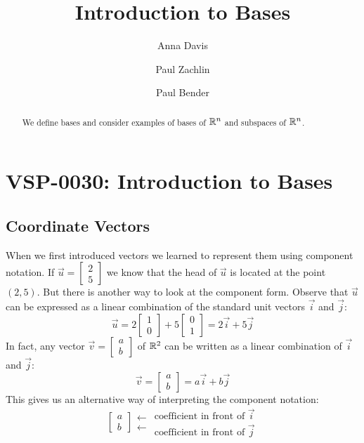 \documentclass{ximera}
\author{Anna Davis \and Paul Zachlin \and Paul Bender} \title{Introduction to Bases} \license{CC-BY 4.0}
\begin{document}
\begin{abstract}
We define bases and consider examples of bases of $\mathbb{R}^n$ and subspaces of $\mathbb{R}^n$.
\end{abstract}
\maketitle

\section*{VSP-0030:  Introduction to Bases}
\subsection*{Coordinate Vectors}
When we first introduced vectors we learned to represent them using component notation.  If $\vec{u}=\begin{bmatrix}2\\5\end{bmatrix}$ we know that the head of $\vec{u}$ is located at the point $(2, 5)$.  But there is another way to look at the component form.  Observe that $\vec{u}$ can be expressed as a linear combination of the standard unit vectors $\vec{i}$ and $\vec{j}$:
$$\vec{u}=2\begin{bmatrix}1\\0\end{bmatrix}+5\begin{bmatrix}0\\1\end{bmatrix}=2\vec{i}+5\vec{j}$$
In fact, any vector $\vec{v}=\begin{bmatrix}a\\b\end{bmatrix}$ of $\mathbb{R}^2$ can be written as a linear combination of $\vec{i}$ and $\vec{j}$:
$$\vec{v}=\begin{bmatrix}a\\b\end{bmatrix}=a\vec{i}+b\vec{j}$$
This gives us an alternative way of interpreting the component notation:
$$\left[\begin{array}{c}  
 a\\b
 \end{array}\right]
 \begin{array}{c}
 \longleftarrow\\
 \longleftarrow
 \end{array}
\begin{array}{c}  
 \mbox{coefficient in front of $\vec{i}$}\\\mbox{coefficient in front of $\vec{j}$}
 \end{array}$$
 
\end{document}
